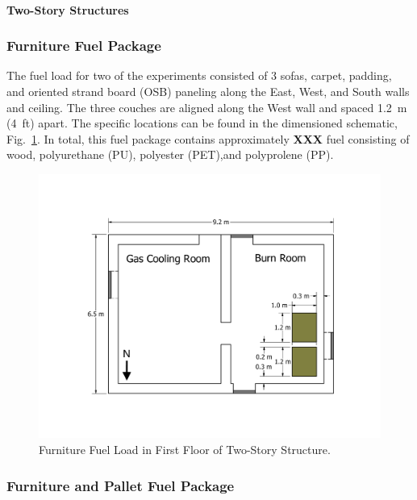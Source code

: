 \documentclass[12pt,oneside]{book}
\begin{document}
\paragraph{Two-Story Structures}
\label{sec:suppresion_two}

\subsubsection{Furniture Fuel Package}
\label{sec:fire_suppression_furniture_fuel_2}

The fuel load for two of the experiments consisted of 3 sofas, carpet, padding, and oriented strand board (OSB) paneling along the East, West, and South walls and ceiling. The three couches are aligned along the West wall and spaced 1.2~m (4~ft) apart. The specific locations can be found in the dimensioned schematic, Fig.~\ref{fig:furniture_2story}. In total, this fuel package contains approximately {\bf XXX} fuel consisting of wood, polyurethane (PU), polyester (PET),and polyprolene (PP).

\begin{figure}[!ht]
	\includegraphics[width=\columnwidth]{../Figures/Floor_Plans/PDFs/West_Structure/DelCo_2012_West_Structure_Pallets}
	\caption{Furniture Fuel Load in First Floor of Two-Story Structure.}
	\label{fig:furniture_2story}
\end{figure}

\subsubsection{Furniture and Pallet Fuel Package}
\label{sec:fire_suppression_combo_fuel_2}
\end{document}
